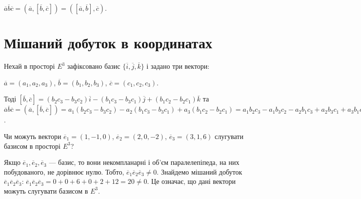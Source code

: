 \begin{claim}
	$\overline{a} \overline{b} \overline{c}
	= (\overline{a},[\overline{b},\overline{c}])
	=([\overline{a},\overline{b}],\overline{c}).$
\end{claim}

\section{Мішаний добуток в координатах}

Нехай в просторі $E^3$ зафіксовано базис $\{\overline{i}, \overline{j}, \overline{k}\}$ і задано три вектори:

$\overline{a} = (a_1, a_2, a_3)$, $\overline{b} = (b_1, b_2, b_3)$, $\overline{c} = (c_1, c_2, c_3)$.

Тоді $[\overline{b}, \overline{c}]
= (b_2c_3-b_3c_2)\overline{i} - (b_1c_3-b_3c_1)\overline{j} + (b_1c_2-b_2c_1)\overline{k}$
та $\overline{a}\overline{b}\overline{c} = (\overline{a},[\overline{b},\overline{c}]) = a_1(b_2c_3-b_3c_2) - a_2(b_1c_3-b_3c_1) + a_3(b_1c_2-b_2c_1) = 
a_1b_2c_3 - a_1b_3c_2 - a_2b_1c_3 + a_2b_3c_1 + a_3b_1c_2 - a_3b_2c_1$.

\begin{problem}
	Чи можуть вектори $\overline{e}_1=(1,-1,0)$, $\overline{e}_2=(2,0,-2)$, $\overline{e}_3=(3,1,6)$ слугувати базисом в просторі $E^3$?
\end{problem}
\begin{solution}
	Якщо $\overline{e}_1, \overline{e}_2, \overline{e}_3$ --- базис, то вони некомпланарні і об’єм
	паралелепіпеда, на них побудованого, не дорівнює нулю. Тобто, $\overline{e}_1\overline{e}_2\overline{e}_3 \neq 0$.
	Знайдемо мішаний добуток $\overline{e}_1\overline{e}_2\overline{e}_3$:
	$\overline{e}_1\overline{e}_2\overline{e}_3 = 0 + 0 + 6 + 0 + 2 + 12 = 20 \neq 0$.
	Це означає, що дані вектори можуть слугувати базисом в $E^3$.
\end{solution}

